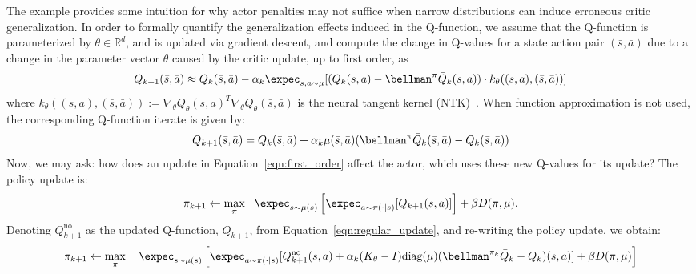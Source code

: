 The example provides some intuition for why actor penalties may not suffice when narrow distributions can induce erroneous critic generalization. In order to formally quantify the generalization effects induced in the Q-function, we assume that the Q-function is parameterized by $\theta \in \mathbb{R}^d$, and is updated via gradient descent, and 
compute the change in Q-values for a state action pair $(\bar{s}, \bar{a})$ due to a change in the parameter vector $\theta$ caused by the critic update, up to first order, as
\begin{equation}
\label{eqn:first_order}
    Q_{k+1}(\bar{s}, \bar{a}) \approx Q_{k}(\bar{s}, \bar{a}) - \alpha_k \expec_{s, a \sim \mu} [(Q_k(s, a) - \bellman^\pi \bar{Q}_k(s, a) ) \cdot k_\theta((s, a), (\bar{s}, \bar{a}))]
\end{equation}
where $k_\theta((s, a), (\bar{s}, \bar{a})) := \nabla_\theta Q_\theta(s, a)^T \nabla_\theta Q_\theta(\bar{s}, \bar{a})$ is the neural tangent kernel (NTK)~\citep{jacot18ntk}. 
When function approximation is not used, the corresponding Q-function iterate is given by:
\begin{equation}
\label{eqn:regular_update}
    Q_{k+1}(\bar{s}, \bar{a}) = Q_k(\bar{s}, \bar{a}) + \alpha_k \mu(\bar{s}, \bar{a}) (\bellman^\pi \bar{Q}_k(\bar{s}, \bar{a}) - Q_k(\bar{s}, \bar{a}))
\end{equation}
Now, we may ask: how does an update in Equation~\ref{eqn:first_order} affect the actor, which uses these new Q-values for its update? The policy update is:
\begin{equation}
\label{eqn:policy_constraint}
    \pi_{k+1} \leftarrow \max_{\pi}~~ \expec_{s \sim \mu(s)}\left[\expec_{a \sim \pi(\cdot|s)} [Q_{k+1}(s, a)] \right] + \beta D(\pi, \mu).
\end{equation}
Denoting $Q_{k+1}^{\text{no}}$ as the updated Q-function, $Q_{k+1}$, from Equation~\ref{eqn:regular_update}, and re-writing the policy update, we obtain:
\begin{equation}
    \pi_{k+1} \leftarrow \max_{\pi}~~~ \expec_{s \sim \mu(s)} \left[\expec_{a \sim \pi(\cdot|s)}[Q_{k+1}^{\text{no}}(s, a) + \alpha_k (K_\theta - I) \text{diag}(\mu) (\bellman^{\pi_k}\bar{Q}_k - Q_k)(s, a)] + \beta D(\pi, \mu) \right]
\end{equation}
